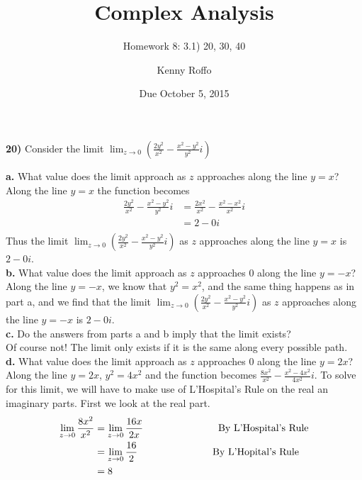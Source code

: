 \documentclass{scrartcl}
\title{Complex Analysis}
\subtitle{Homework 8: 3.1) 20, 30, 40}
\author{Kenny Roffo}
\date{Due October 5, 2015}
\begin{document}
\maketitle

\textbf{20)} Consider the limit $\lim_{z\rightarrow0} \left(\frac{2y^2}{x^2} - \frac{x^2 - y^2}{y^2}i\right)$

\textbf{a.} What value does the limit approach as $z$ approaches along the line $y=x$?\\

  Along the line $y=x$ the function becomes 
\begin{align*}
\frac{2y^2}{x^2} - \frac{x^2 - y^2}{y^2}i &= \frac{2x^2}{x^2} - \frac{x^2 - x^2}{x^2}i\\
                                         &= 2 - 0i\\
\end{align*}
Thus the limit $\lim_{z\rightarrow0} \left(\frac{2y^2}{x^2} - \frac{x^2 - y^2}{y^2}i\right)$ as $z$ approaches along the line $y=x$ is $2-0i$.\\

\textbf{b.} What value does the limit approach as $z$ approaches 0 along the line $y=-x$?\\

  Along the line $y=-x$, we know that $y^2=x^2$, and the same thing happens as in part a, and we find that the limit $\lim_{z\rightarrow0} \left(\frac{2y^2}{x^2} - \frac{x^2 - y^2}{y^2}i\right)$ as $z$ approaches along the line $y=-x$ is $2-0i$.\\

\textbf{c.} Do the answers from parts a and b imply that the limit exists?\\

  Of course not! The limit only exists if it is the same along every possible path.\\

\textbf{d.} What value does the limit approach as $z$ approaches 0 along the line $y=2x$?\\

  Along the line $y=2x$, $y^2=4x^2$ and the function becomes $\frac{8x^2}{x^2} - \frac{x^2 - 4x^2}{4x^2}i$. To solve for this limit, we will have to make use of L'Hospital's Rule on the real an imaginary parts. First we look at the real part.
\begin{align*}
  \lim_{z\rightarrow0}\frac{8x^2}{x^2} &= \lim_{z\rightarrow0}\frac{16x}{2x} \text{\hspace{1in} By L'Hospital's Rule}\\
                                    &= \lim_{z\rightarrow0}\frac{16}{2} \text{\hspace{1in} By L'Hopital's Rule}\\
                                    &= 8
\end{align*}
\end{document}
